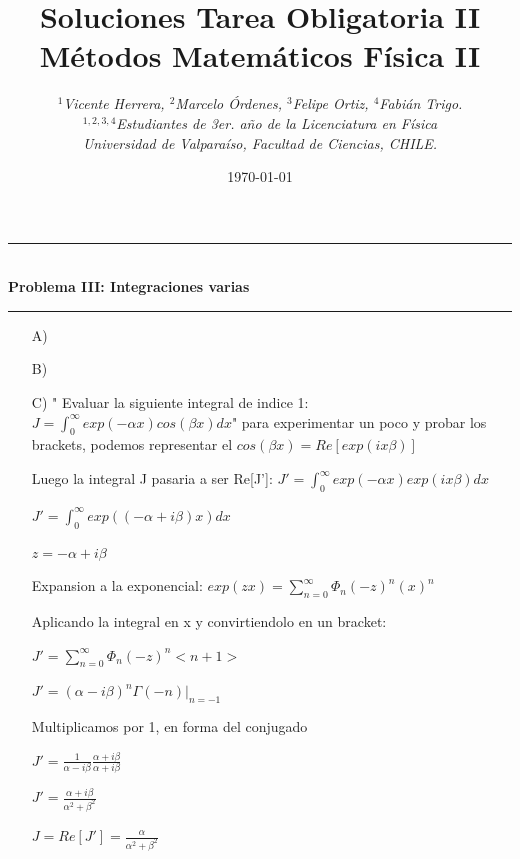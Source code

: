 \documentclass[12pt]{article}
\begin{document}
	
	\title{\textbf{Soluciones Tarea Obligatoria II\\ M\'etodos Matem\'aticos F\'isica II }}
	\author{\textit{$^{1}$Vicente Herrera, $^{2}$Marcelo \'Ordenes, $^{3}$Felipe Ortiz, $^{4}$Fabi\'an Trigo.}\\
		\small{\textit{$^{1,2,3,4}$Estudiantes de 3er. a\~{n}o de la Licenciatura en F\'isica}}\\
		\small {\textit{Universidad de Valpara\'iso, Facultad de Ciencias, CHILE.}}
	}
	\date{\small{\today}}
	
	\maketitle
	\thispagestyle{fancy}
\rule{112mm}{0.1mm}\\
\textbf{Problema III: Integraciones varias}\\
\rule{112mm}{0.1mm}
\begin{enumerate}
	\item [A)]
	\item [B)]
	\item [C)] " Evaluar la siguiente integral de indice 1: $J = \int_{0}^{\infty} exp(-\alpha x)cos(\beta x) dx $" para experimentar un poco y probar los brackets, podemos representar el $cos(\beta x) = Re[exp(ix\beta)]$
	
	Luego la integral J pasaria a ser Re[J']:
	$ J' = \int_{0}^{\infty} exp(-\alpha x)exp(ix\beta) dx $
	
	$ J' = \int_{0}^{\infty} exp((-\alpha + i\beta )x) dx $
	
	$z = -\alpha + i \beta$
	
	Expansion a la exponencial: $exp(zx) = \sum_{n=0}^{\infty} \Phi_n (-z)^n (x)^n $
	
	Aplicando la integral en x y convirtiendolo en un bracket:
	
	$J' = \sum_{n=0}^{\infty} \Phi_n (-z)^n < n+1 > $
	
	$J' = (\alpha - i\beta)^n \Gamma(-n) |_{n=-1}$
	
	Multiplicamos por 1, en forma del conjugado
	
	$J' = \frac{1}{\alpha - i\beta} \frac{\alpha + i\beta}{\alpha + i\beta}$
	
	$J' = \frac{\alpha + i\beta}{\alpha^2 + \beta^2}$
	
	$J = Re[J'] = \frac{\alpha}{\alpha^2 + \beta^2}$
	
\end{enumerate}
\end{document}
